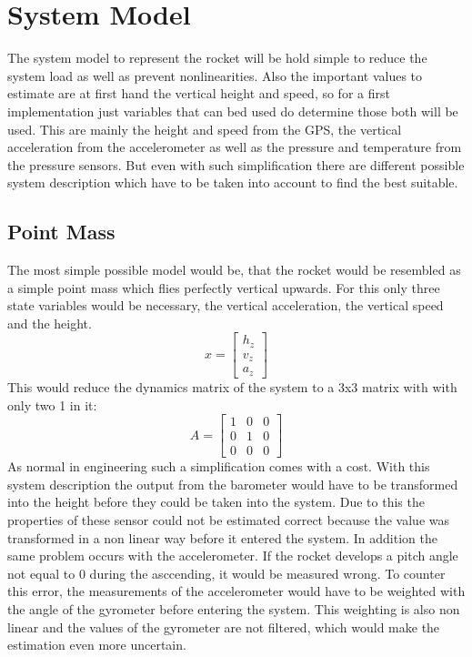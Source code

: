   \section{System Model}
  The system model to represent the rocket
  will be hold simple to reduce the system load as well as prevent nonlinearities.
  Also the important values to estimate are at first hand the vertical height and speed, so
  for a first implementation just variables that can bed used do determine those both will be used.
  This are mainly the height and speed from the GPS, the vertical acceleration from the accelerometer
  as well as the pressure and temperature from the pressure sensors.
  But even with such simplification there are different possible system description which have to be taken into account 
  to find the best suitable.
  
  \subsection{Point Mass}
  The most simple possible model would be, that the rocket would be resembled as a simple point mass which flies perfectly vertical upwards.
  For this only three state variables would be necessary, the vertical acceleration, the vertical speed and the height.
  $$x = \begin{bmatrix}
  h_z\\
  v_z\\
  a_z
  \end{bmatrix} $$ 
  This would reduce the dynamics matrix of the system to a 3x3 matrix with with only two 1 in it:
  $$ A = \begin{bmatrix}
  1 & 0 & 0\\
  0 & 1 & 0\\
  0 & 0 & 0
  \end{bmatrix} $$ 
  As normal in engineering such a simplification comes with a cost. With this system description the output from the barometer would have
  to be transformed into the height before they could be taken into the system. 
  Due to this the properties of these sensor could not be estimated correct because the value was transformed in a non linear way before it entered the system.
  In addition the same problem occurs with the accelerometer. If the rocket develops a pitch angle not equal to 0 during the asccending, it would be measured wrong.
  To counter this error, the measurements of the accelerometer would have to be weighted with the angle of the gyrometer before entering the system.
  This weighting is also non linear and the values of the gyrometer are not filtered, which would make the estimation even more uncertain.
  
